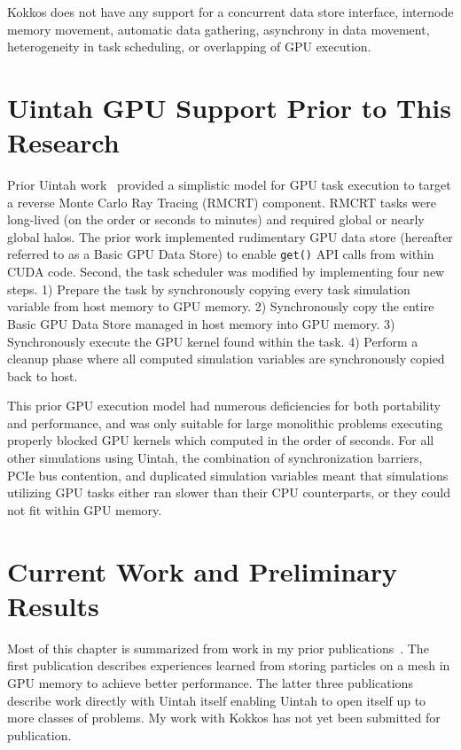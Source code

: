 \documentclass[12pt]{article}
\begin{document}
  
Kokkos does not have any support for a concurrent data store interface, internode memory movement, automatic data gathering, asynchrony in data movement, heterogeneity in task scheduling, or overlapping of GPU execution.



\section{Uintah GPU Support Prior to This Research}
\label{ch:uintah_prior}

Prior Uintah work~\cite{wolfhpc12} provided a simplistic model for GPU task execution to target a reverse Monte Carlo Ray Tracing (RMCRT) component.  RMCRT tasks were long-lived (on the order or seconds to minutes) and required global or nearly global halos.  The prior work implemented rudimentary GPU data store (hereafter referred to as a Basic GPU Data Store) to enable \texttt{get()} API calls from within CUDA code.  Second, the task scheduler was modified by implementing four new steps.  1) Prepare the task by synchronously copying every task simulation variable from host memory to GPU memory. 2) Synchronously copy the entire Basic GPU Data Store managed in host memory into GPU memory.  3) Synchronously execute the GPU kernel found within the task.  4) Perform a cleanup phase where all computed simulation variables are synchronously copied back to host.  
	
This prior GPU execution model had numerous deficiencies for both portability and performance, and was only suitable for large monolithic problems executing properly blocked GPU kernels which computed in the order of seconds.  For all other simulations using Uintah, the combination of synchronization barriers, PCIe bus contention, and duplicated simulation variables meant that simulations utilizing GPU tasks either ran slower than their CPU counterparts, or they could not fit within GPU memory.  

\section{Current Work and Preliminary Results}
\label{ch:uintah_current}

Most of this chapter is summarized from work in my prior publications~\cite{saahpc-2010-brad, wolfhpc15,ijpp16, espm2-brad}.  The first publication describes experiences learned from storing particles on a mesh in GPU memory to achieve better performance.  The latter three publications describe work directly with Uintah itself enabling Uintah to open itself up to more classes of problems.  My work with Kokkos has not yet been submitted for publication.  
\end{document}
